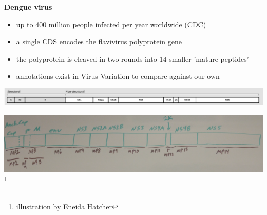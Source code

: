 \documentclass[landscape]{slides}
\begin{document}
\begin{slide}
\begin{center}
\textbf{Dengue virus}

\small
\begin{itemize}
\item up to 400 million people infected per year worldwide (CDC)
\item a single CDS encodes the flavivirus polyprotein gene
\item the polyprotein is cleaved in two rounds into 14 smaller 'mature peptides'
\item annotations exist in Virus Variation to compare against our own
\end{itemize}

\includegraphics[width=9.5in]{figs/dengue-genome-organization}

\includegraphics[width=9.5in]{figs/dengue-eneida}\footnote{illustration
  by Eneida Hatcher}


\end{center}
\vfill
\end{slide}
\end{document}
